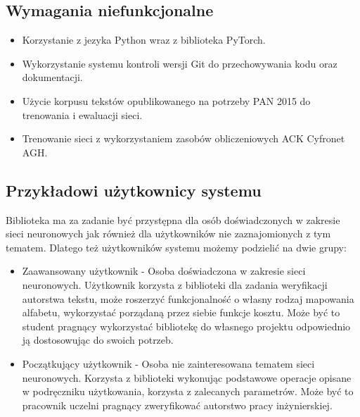 \subsection{Wymagania niefunkcjonalne}
\begin{itemize}
 	\item Korzystanie z jezyka Python wraz z biblioteka PyTorch.
 	\item Wykorzystanie systemu kontroli wersji Git do przechowywania kodu oraz dokumentacji.
 	\item Użycie korpusu tekstów opublikowanego na potrzeby PAN 2015 do trenowania i ewaluacji sieci.
 	\item Trenowanie sieci z wykorzystaniem zasobów obliczeniowych ACK Cyfronet AGH.
\end{itemize}

\subsection{Przykładowi użytkownicy systemu}
Biblioteka ma za zadanie być przystępna dla osób doświadczonych w zakresie sieci neuronowych jak również
dla użytkowników nie zaznajomionych z tym tematem. Dlatego też użytkowników systemu możemy podzielić 
na dwie grupy:
\begin{itemize}
 	\item Zaawansowany użytkownik - Osoba doświadczona w zakresie sieci neuronowych. Użytkownik korzysta
 	z biblioteki dla zadania weryfikacji autorstwa tekstu, może roszerzyć funkcjonalność o własny rodzaj
 	mapowania alfabetu, wykorzystać porządaną przez siebie funkcje kosztu. Może być to student pragnący
 	wykorzystać bibliotekę do własnego projektu odpowiednio ją dostosowując do swoich potrzeb.
 	\item Początkujący użytkownik - Osoba nie zainteresowana tematem sieci neuronowych. Korzysta z biblioteki
 	wykonując podstawowe operacje opisane w podręczniku użytkowania, korzysta z zalecanych parametrów.
 	Może być to pracownik uczelni pragnący zweryfikować autorstwo pracy inżynierskiej.
\end{itemize}
